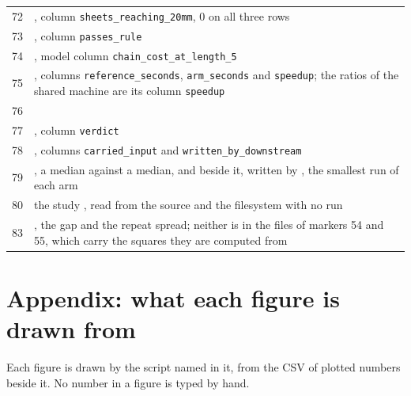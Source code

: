 \begin{xltabular}{\textwidth}{rX}
72 & \protect{}, column \texttt{sheets\_\allowbreak{}reaching\_\allowbreak{}20mm}, 0 on all three rows \\
73 & \protect{}, column \texttt{passes\_\allowbreak{}rule} \\
74 & \protect{}, model column \texttt{chain\_\allowbreak{}cost\_\allowbreak{}at\_\allowbreak{}length\_\allowbreak{}5} \\
75 & \protect{}, columns \texttt{reference\_\allowbreak{}seconds}, \texttt{arm\_\allowbreak{}seconds} and \texttt{speedup}; the ratios of the shared machine are its column \texttt{speedup} \\
76 & \protect{} \\
77 & \protect{}, column \texttt{verdict} \\
78 & \protect{}, columns \texttt{carried\_\allowbreak{}input} and \texttt{written\_\allowbreak{}by\_\allowbreak{}downstream} \\
79 & \protect{}, a median against a median, and \protect{} beside it, written by \protect{}, the smallest run of each arm \\
80 & the study \protect{}, read from the source and the filesystem with no run \\
83 & \protect{}, the gap and the repeat spread; neither is in the files of markers 54 and 55, which carry the squares they are computed from \\
\end{xltabular}

\section*{Appendix: what each figure is drawn from}

Each figure is drawn by the script named in it, from the CSV of plotted numbers beside it. No number in a figure is typed by hand.

